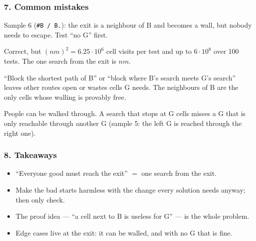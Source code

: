 \subsubsection*{7. Common mistakes}

\begin{warningbox}
Sample 6 (\texttt{\#B / B.}): the exit is a neighbour of B and becomes a wall, but nobody needs to escape. Test ``no G'' first.
\end{warningbox}

\begin{warningbox}
Correct, but $(nm)^2 = 6.25 \cdot 10^6$ cell visits per test and up to $6 \cdot 10^8$ over 100 tests. The one search from the exit is $nm$.
\end{warningbox}

\begin{warningbox}
``Block the shortest path of B'' or ``block where B's search meets G's search'' leaves other routes open or wastes cells G needs. The neighbours of B are the only cells whose walling is provably free.
\end{warningbox}

\begin{warningbox}
People can be walked through. A search that stops at G cells misses a G that is only reachable through another G (sample 5: the left G is reached through the right one).
\end{warningbox}

\subsubsection*{8. Takeaways}

\begin{itemize}[leftmargin=*]
    \item ``Everyone good must reach the exit'' $=$ one search from the exit.
    \item Make the bad starts harmless with the change every solution needs anyway; then only check.
    \item The proof idea --- ``a cell next to B is useless for G'' --- is the whole problem.
    \item Edge cases live at the exit: it can be walled, and with no G that is fine.
\end{itemize}

